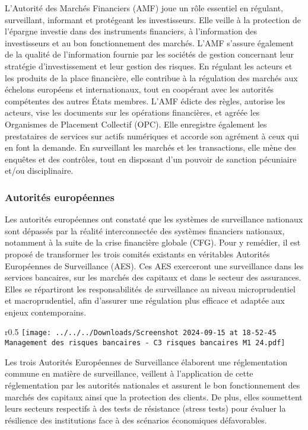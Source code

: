 \documentclass[a4paper, 12pt]{report}
\begin{document}
L'Autorité des Marchés Financiers (AMF) joue un rôle essentiel en régulant, surveillant, informant et protégeant les investisseurs. Elle veille à la protection de l'épargne investie dans des instruments financiers, à l'information des investisseurs et au bon fonctionnement des marchés. L'AMF s'assure également de la qualité de l'information fournie par les sociétés de gestion concernant leur stratégie d'investissement et leur gestion des risques. En régulant les acteurs et les produits de la place financière, elle contribue à la régulation des marchés aux échelons européens et internationaux, tout en coopérant avec les autorités compétentes des autres États membres. L'AMF édicte des règles, autorise les acteurs, vise les documents sur les opérations financières, et agréée les Organismes de Placement Collectif (OPC). Elle enregistre également les prestataires de services sur actifs numériques et accorde son agrément à ceux qui en font la demande. En surveillant les marchés et les transactions, elle mène des enquêtes et des contrôles, tout en disposant d'un pouvoir de sanction pécuniaire et/ou disciplinaire.

\subsubsection{Autorités européennes}

Les autorités européennes ont constaté que les systèmes de surveillance nationaux sont dépassés par la réalité interconnectée des systèmes financiers nationaux, notamment à la suite de la crise financière globale (CFG). Pour y remédier, il est proposé de transformer les trois comités existants en véritables Autorités Européennes de Surveillance (AES). Ces AES exerceront une surveillance dans les services bancaires, sur les marchés des capitaux et dans le secteur des assurances. Elles se répartiront les responsabilités de surveillance au niveau microprudentiel et macroprudentiel, afin d'assurer une régulation plus efficace et adaptée aux enjeux contemporains.
\newpage
\begin{wrapfigure}{r}{0.5\textwidth}
	\centering
	\texttt{[image: ../../../Downloads/Screenshot 2024-09-15 at 18-52-45 Management des risques bancaires - C3 risques bancaires M1 24.pdf]}
\end{wrapfigure}

Les trois Autorités Européennes de Surveillance élaborent une réglementation commune en matière de surveillance, veillent à l'application de cette réglementation par les autorités nationales et assurent le bon fonctionnement des marchés des capitaux ainsi que la protection des clients. De plus, elles soumettent leurs secteurs respectifs à des tests de résistance (stress tests) pour évaluer la résilience des institutions face à des scénarios économiques défavorables.
\end{document}
